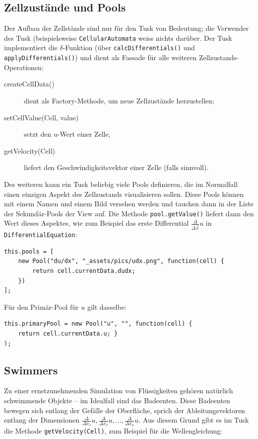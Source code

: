 \documentclass[11pt]{report} %
\theoremstyle{definition}
\begin{document}
\subsection{Zellzustände und Pools}

Der Aufbau der Zellstände sind nur für den Tusk von Bedeutung; die Verwender des Tusk (beispielsweise {\tt CellularAutomata} weiss nichts darüber. Der Tusk implementiert die $\delta$-Funktion (über {\tt calcDifferentials()} und {\tt applyDifferentials()}) und dient als Fassade für alle weiteren Zellzustands-Operationen:

\begin{description}
\item[createCellData()] dient als Factory-Methode, um neue Zellzustände herzustellen;
\item[setCellValue(Cell, value)] setzt den $u$-Wert einer Zelle,
\item[getVelocity(Cell)] liefert den Geschwindigkeitsvektor einer Zelle (falls sinnvoll).
\end{description}

Des weiteren kann ein Tusk beliebig viele Pools definieren, die im Normalfall einen einzigen Aspekt des Zellzustands visualisieren sollen. Diese Pools können mit einem Namen und einem Bild versehen werden und tauchen dann in der Liste der Sekundär-Pools der View auf. Die Methode {\tt pool.getValue()} liefert dann den Wert dieses Aspektes, wie zum Beispiel das erste Differential $\frac{\Delta}{\Delta \vec x} u$ in {\tt DifferentialEquation}:

\begin{lstlisting}
this.pools = [
	new Pool("du/dx", "_assets/pics/udx.png", function(cell) {
		return cell.currentData.dudx;
	})
];
\end{lstlisting}

Für den Primär-Pool für $u$ gilt dasselbe:
\begin{lstlisting}
this.primaryPool = new Pool("u", "", function(cell) {
	return cell.currentData.u; }
);
\end{lstlisting}

\subsection{Swimmers}

Zu einer ernstzunehmenden Simulation von Flüssigkeiten gehören natürlich schwimmende Objekte -- im Idealfall sind das Badeenten. Diese Badeenten bewegen sich entlang der Gefälle der Oberfläche, sprich der Ableitungsvektoren entlang der Dimensionen $\frac {\Delta}{\Delta x_1}u, \frac {\Delta}{\Delta x_2}u, \dots, \frac {\Delta}{\Delta x_n}u$. Aus diesem Grund gibt es im Tusk die Methode {\tt getVelocity(Cell)}, zum Beispiel für die Wellengleichung:
\end{document}
